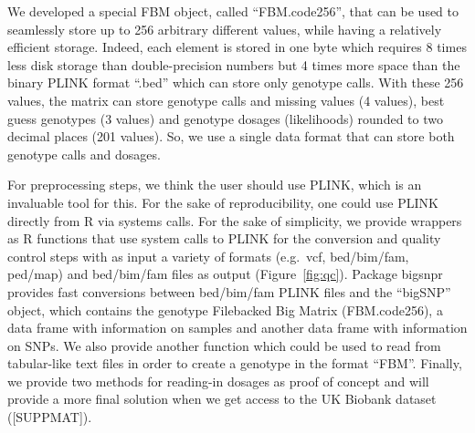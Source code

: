 \documentclass{bioinfo}
\begin{document}
\begin{methods}
{\color{red}
We developed a special FBM object, called ``FBM.code256'', that can be used to seamlessly store up to 256 arbitrary different values, while having a relatively efficient storage. Indeed, each element is stored in one byte which requires 8 times less disk storage than double-precision numbers but 4 times more space than the binary PLINK format ``.bed'' which can store only genotype calls. With these 256 values, the matrix can store genotype calls and missing values (4 values), best guess genotypes (3 values) and genotype dosages (likelihoods) rounded to two decimal places (201 values). So, we use a single data format that can store both genotype calls and dosages.

For preprocessing steps, we think the user should use PLINK, which is an invaluable tool for this. For the sake of reproducibility, one could use PLINK directly from R via systems calls. For the sake of simplicity, we provide wrappers as R functions that use system calls to PLINK for the conversion and quality control steps with as input a variety of formats (e.g.\ vcf, bed/bim/fam, ped/map) and bed/bim/fam files as output (Figure~\ref{fig:qc}).
Package bigsnpr provides fast conversions between bed/bim/fam PLINK files and the ``bigSNP'' object, which contains the genotype Filebacked Big Matrix (FBM.code256), a data frame with information on samples and another data frame with information on SNPs. We also provide another function which could be used to read from tabular-like text files in order to create a genotype in the format ``FBM''. Finally, we provide two methods for reading-in dosages as proof of concept and will provide a more final solution when we get access to the UK Biobank dataset ([SUPPMAT]).

}
\end{methods}
\end{document}
